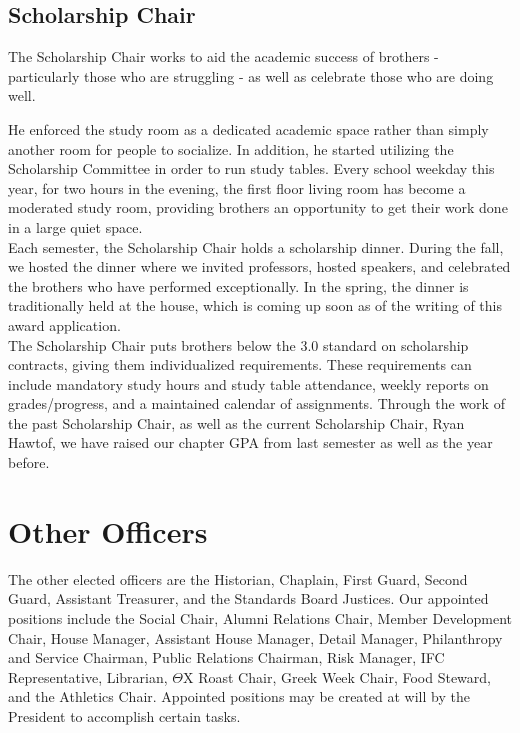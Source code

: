       \subsection*{Scholarship Chair}
	The Scholarship Chair works to aid the academic success of brothers - particularly those who are struggling - as well as celebrate those who are doing well.

	He enforced the study room as a dedicated academic space rather than simply another room for people to socialize. In addition, he started utilizing the Scholarship Committee in order to run study tables. Every school weekday this year, for two hours in the evening, the first floor living room has become a moderated study room, providing brothers an opportunity to get their work done in a large quiet space. \\

	Each semester, the Scholarship Chair holds a scholarship dinner. During the fall, we hosted the dinner where we invited professors, hosted speakers, and celebrated the brothers who have performed exceptionally. In the spring, the dinner is traditionally held at the house, which is coming up soon as of the writing of this award application. \\

	The Scholarship Chair puts brothers below the 3.0 standard on scholarship contracts, giving them individualized requirements. These requirements can include mandatory study hours and study table attendance, weekly reports on grades/progress, and a maintained calendar of assignments. Through the work of the past Scholarship Chair, as well as the current Scholarship Chair, Ryan Hawtof, we have raised our chapter GPA from last semester as well as the year before. 
	
    \section*{Other Officers}
	The other elected officers are the Historian, Chaplain, First Guard, Second Guard, Assistant Treasurer, and the Standards Board Justices. Our appointed positions include the Social Chair, Alumni Relations Chair, Member Development Chair, House Manager, Assistant House Manager, Detail Manager, Philanthropy and Service Chairman, Public Relations Chairman, Risk Manager, IFC Representative, Librarian, $\Theta$X Roast Chair, Greek Week Chair, Food Steward, and the Athletics Chair. Appointed positions may be created at will by the President to accomplish certain tasks.
	
